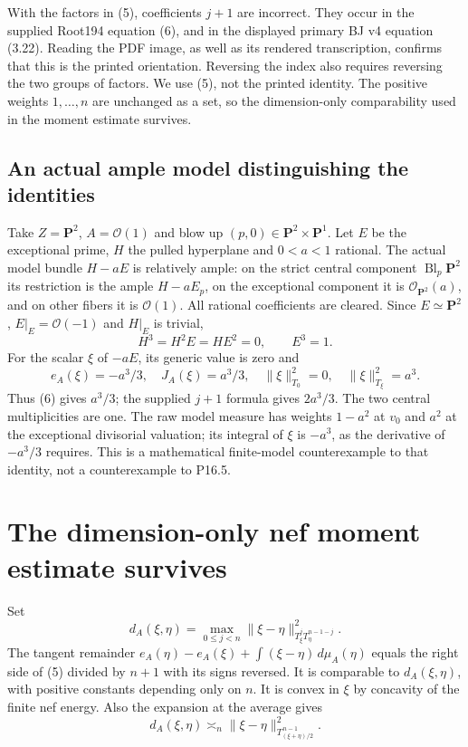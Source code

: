 \documentclass[10pt]{article}
\newcommand{\OO}{\mathcal O}
\begin{document}
With the factors in (5), coefficients $j+1$ are incorrect.
They occur in the supplied Root194 equation (6), and in the displayed
primary BJ v4 equation (3.22). Reading the PDF image, as well as its
rendered transcription, confirms that this is the printed orientation.
Reversing the index also requires reversing the two groups of factors.
We use (5), not the printed identity. The positive weights $1,\ldots,n$
are unchanged as a set, so the dimension-only comparability used in
the moment estimate survives.

\subsection{An actual ample model distinguishing the identities}
Take $Z=\mathbf P^2$, $A=\OO(1)$ and blow up
$(p,0)\in\mathbf P^2\times\mathbf P^1$. Let $E$ be the exceptional
prime, $H$ the pulled hyperplane and $0<a<1$ rational.
The actual model bundle $H-aE$ is relatively ample: on the strict
central component $\operatorname{Bl}_p\mathbf P^2$ its restriction is
the ample $H-aE_p$, on the exceptional component it is
$\OO_{\mathbf P^2}(a)$, and on other fibers it is $\OO(1)$.
All rational coefficients are cleared.
Since $E\simeq\mathbf P^2$, $E|_E=\OO(-1)$ and $H|_E$ is trivial,
\[
 H^3=H^2E=HE^2=0,\qquad E^3=1.
\]
For the scalar $\xi$ of $-aE$, its generic value is zero and
\[
 e_A(\xi)=-a^3/3,\quad J_A(\xi)=a^3/3,\quad
 \|\xi\|_{T_0}^2=0,\quad\|\xi\|_{T_\xi}^2=a^3.                \tag{7}
\]
Thus (6) gives $a^3/3$; the supplied $j+1$ formula gives $2a^3/3$.
The two central multiplicities are one. The raw model measure has
weights $1-a^2$ at $v_0$ and $a^2$ at the exceptional divisorial
valuation; its integral of $\xi$ is $-a^3$, as the derivative of
$-a^3/3$ requires. This is a mathematical finite-model
counterexample to that identity, not a counterexample to P16.5.

\section{The dimension-only nef moment estimate survives}
Set
\[
 d_A(\xi,\eta)=\max_{0\leq j<n}
       \|\xi-\eta\|_{T_\xi^jT_\eta^{n-1-j}}^2.
\]
The tangent remainder
$e_A(\eta)-e_A(\xi)+\int(\xi-\eta)\,d\mu_A(\eta)$ equals the
right side of (5) divided by $n+1$ with its signs reversed.
It is comparable to $d_A(\xi,\eta)$, with positive constants depending
only on $n$. It is convex in $\xi$ by concavity of the finite nef
energy. Also the expansion at the average gives
\[
 d_A(\xi,\eta)\asymp_n
 \|\xi-\eta\|_{T_{(\xi+\eta)/2}^{\,n-1}}^2.                   \tag{8}
\]
\end{document}
